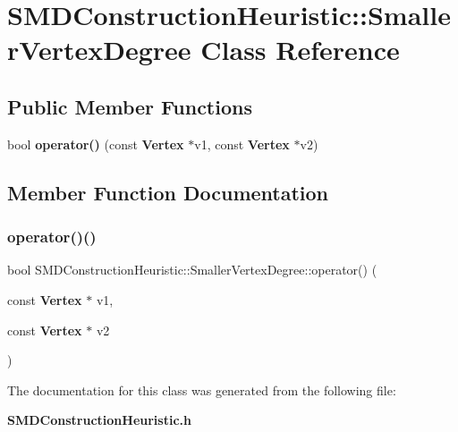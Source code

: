 \section{S\+M\+D\+Construction\+Heuristic\+:\+:Smaller\+Vertex\+Degree Class Reference}
\label{classSMDConstructionHeuristic_1_1SmallerVertexDegree}
\subsection*{Public Member Functions}
\begin{DoxyCompactItemize}
\item 
bool \textbf{ operator()} (const \textbf{ Vertex} $\ast$v1, const \textbf{ Vertex} $\ast$v2)
\end{DoxyCompactItemize}


\subsection{Member Function Documentation}
\mbox{\label{classSMDConstructionHeuristic_1_1SmallerVertexDegree_a5f9dd3542bc908e034cbd42239b65353}} 
\subsubsection{operator()()}
{\footnotesize\ttfamily bool S\+M\+D\+Construction\+Heuristic\+::\+Smaller\+Vertex\+Degree\+::operator() (\begin{DoxyParamCaption}\item[{const \textbf{ Vertex} $\ast$}]{v1,  }\item[{const \textbf{ Vertex} $\ast$}]{v2 }\end{DoxyParamCaption})\hspace{0.3cm}{\ttfamily [inline]}}



The documentation for this class was generated from the following file\+:\begin{DoxyCompactItemize}
\item 
\textbf{ S\+M\+D\+Construction\+Heuristic.\+h}\end{DoxyCompactItemize}
